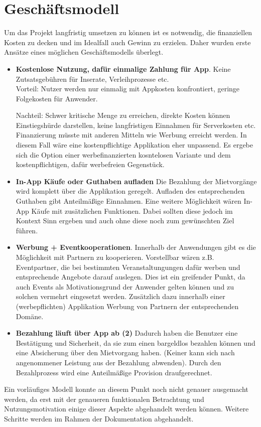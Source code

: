 
\section{Geschäftsmodell}
Um das Projekt langfristig umsetzen zu können ist es notwendig, die finanziellen Kosten zu decken und im Idealfall auch Gewinn zu erzielen. 
Daher wurden erste Ansätze eines möglichen Geschäftsmodells überlegt.

\begin{itemize}
   \item \textbf{Kostenlose Nutzung, dafür einmalige Zahlung für App}. Keine Zutsatsgebühren für Inserate, Verleihprozesse etc.\\
   Vorteil: Nutzer werden nur einmalig mit Appkosten konfrontiert, geringe Folgekosten für Anwender.

   Nachteil: Schwer kritische Menge zu erreichen, direkte Kosten können Einstiegshürde darstellen, keine langfristigen Einnahmen für Serverkosten etc. Finanzierung müsste mit anderen Mitteln wie Werbung erreicht werden. In diesem Fall wäre eine kostenpflichtige Applikation eher unpassend. Es ergebe sich die Option einer werbefinanzierten kosntelosen Variante und dem kostenpflichtigen, dafür werbefreien Gegenstück.

   \item \textbf{In-App Käufe oder Guthaben aufladen} 
   Die Bezahlung der Mietvorgänge wird komplett über die Applikation geregelt. Aufladen des entsprechenden Guthaben gibt Anteilmäßige Einnahmen. Eine weitere Möglichkeit wären In-App Käufe mit zusätzlichen Funktionen. Dabei sollten diese jedoch im Kontext Sinn ergeben und auch ohne diese noch zum gewünschten Ziel führen. 

   \item \textbf{Werbung + Eventkooperationen}.
   Innerhalb der Anwendungen gibt es die Möglichkeit mit Partnern zu kooperieren. Vorstellbar wären z.B. Eventpartner, die bei bestimmten Veranstaltungungen dafür werben und entsprechende Angebote darauf auslegen. Dies ist ein greifender Punkt, da auch Events als Motivationsgrund der Anwender gelten können und zu solchen vermehrt eingesetzt werden. Zusätzlich dazu innerhalb einer (werbepflichten) Applikation Werbung von Partnern der entsprechenden Domäne.

   \item \textbf{Bezahlung läuft über App ab (2)} 
   Dadurch haben die Benutzer eine Bestätigung und Sicherheit, da sie zum einen bargeldlos bezahlen können und eine Absicherung über den Mietvorgang haben. (Keiner kann sich nach angenommener Leistung aus der Bezahlung abwenden). Durch den Bezahlprozess wird eine Anteilmäßige Provision draufgerechnet. 

\end{itemize}
 
Ein vorläufiges Modell konnte an diesem Punkt noch nicht genauer ausgemacht werden, da erst mit der genaueren funktionalen Betrachtung und Nutzungsmotivation einige dieser Aspekte abgehandelt werden können. Weitere Schritte werden im Rahmen der Dokumentation abgehandelt.